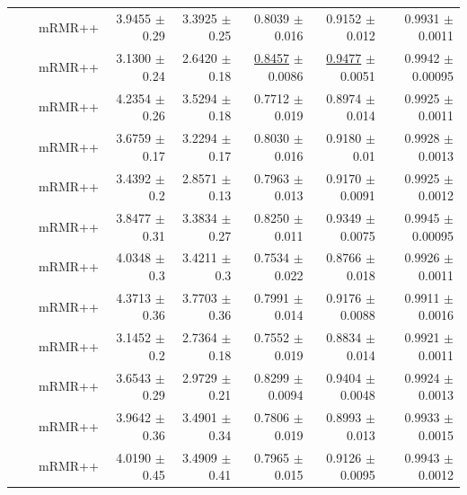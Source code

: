 \begin{longtable}{llp{}rrrrr}
 &  & mRMR++ & 3.9455 {\scriptsize $\pm$ 0.29} & 3.3925 {\scriptsize $\pm$ 0.25} & 0.8039 {\scriptsize $\pm$ 0.016} & 0.9152 {\scriptsize $\pm$ 0.012} & 0.9931 {\scriptsize $\pm$ 0.0011} \\
 &  & mRMR++ & 3.1300 {\scriptsize $\pm$ 0.24} & 2.6420 {\scriptsize $\pm$ 0.18} & \underline{0.8457} {\scriptsize $\pm$ 0.0086} & \underline{0.9477} {\scriptsize $\pm$ 0.0051} & 0.9942 {\scriptsize $\pm$ 0.00095} \\
 &  & mRMR++ & 4.2354 {\scriptsize $\pm$ 0.26} & 3.5294 {\scriptsize $\pm$ 0.18} & 0.7712 {\scriptsize $\pm$ 0.019} & 0.8974 {\scriptsize $\pm$ 0.014} & 0.9925 {\scriptsize $\pm$ 0.0011} \\
 &  & mRMR++ & 3.6759 {\scriptsize $\pm$ 0.17} & 3.2294 {\scriptsize $\pm$ 0.17} & 0.8030 {\scriptsize $\pm$ 0.016} & 0.9180 {\scriptsize $\pm$ 0.01} & 0.9928 {\scriptsize $\pm$ 0.0013} \\
 &  & mRMR++ & 3.4392 {\scriptsize $\pm$ 0.2} & 2.8571 {\scriptsize $\pm$ 0.13} & 0.7963 {\scriptsize $\pm$ 0.013} & 0.9170 {\scriptsize $\pm$ 0.0091} & 0.9925 {\scriptsize $\pm$ 0.0012} \\
 &  & mRMR++ & 3.8477 {\scriptsize $\pm$ 0.31} & 3.3834 {\scriptsize $\pm$ 0.27} & 0.8250 {\scriptsize $\pm$ 0.011} & 0.9349 {\scriptsize $\pm$ 0.0075} & 0.9945 {\scriptsize $\pm$ 0.00095} \\
 &  & mRMR++ & 4.0348 {\scriptsize $\pm$ 0.3} & 3.4211 {\scriptsize $\pm$ 0.3} & 0.7534 {\scriptsize $\pm$ 0.022} & 0.8766 {\scriptsize $\pm$ 0.018} & 0.9926 {\scriptsize $\pm$ 0.0011} \\
 &  & mRMR++ & 4.3713 {\scriptsize $\pm$ 0.36} & 3.7703 {\scriptsize $\pm$ 0.36} & 0.7991 {\scriptsize $\pm$ 0.014} & 0.9176 {\scriptsize $\pm$ 0.0088} & 0.9911 {\scriptsize $\pm$ 0.0016} \\
 &  & mRMR++ & 3.1452 {\scriptsize $\pm$ 0.2} & 2.7364 {\scriptsize $\pm$ 0.18} & 0.7552 {\scriptsize $\pm$ 0.019} & 0.8834 {\scriptsize $\pm$ 0.014} & 0.9921 {\scriptsize $\pm$ 0.0011} \\
 &  & mRMR++ & 3.6543 {\scriptsize $\pm$ 0.29} & 2.9729 {\scriptsize $\pm$ 0.21} & 0.8299 {\scriptsize $\pm$ 0.0094} & 0.9404 {\scriptsize $\pm$ 0.0048} & 0.9924 {\scriptsize $\pm$ 0.0013} \\
 &  & mRMR++ & 3.9642 {\scriptsize $\pm$ 0.36} & 3.4901 {\scriptsize $\pm$ 0.34} & 0.7806 {\scriptsize $\pm$ 0.019} & 0.8993 {\scriptsize $\pm$ 0.013} & 0.9933 {\scriptsize $\pm$ 0.0015} \\
 &  & mRMR++ & 4.0190 {\scriptsize $\pm$ 0.45} & 3.4909 {\scriptsize $\pm$ 0.41} & 0.7965 {\scriptsize $\pm$ 0.015} & 0.9126 {\scriptsize $\pm$ 0.0095} & 0.9943 {\scriptsize $\pm$ 0.0012} \\

\end{longtable}
